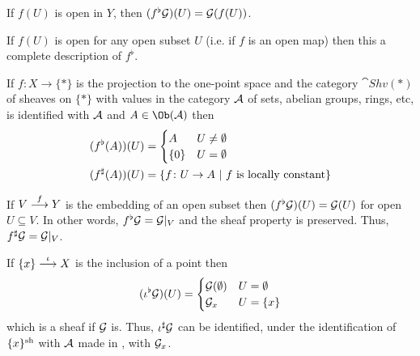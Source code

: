 \documentclass[a4paper,parskip=half,numbers=enddot, DIV=12]{scrreprt}
\begin{document}
    \begin{example}
        \begin{alphanumerate}
          \item 
            If $f(U)$ is open in $Y$, then $(f^\flat\mathcal{G})(U) = \mathcal{G}(f(U))$.
          \item 
            If $f(U)$ is open for any open subset $U$ (i.e. if $f$ is an open map) then this a complete description of $f^\flat$.
          \item 
            If $f\colon X\to \{*\}$ is the projection to the one-point space and the category $\cat{Shv}(*)$ of sheaves on $\{*\}$ with values in the category $\mathcal{A}$ of sets, abelian groups, rings, etc, is identified with $\mathcal{A}$ and $A\in\Ob(\Aa)$ then 
            \begin{align*}
                (f^\flat(A))(U) &= \begin{cases} A &U\neq\emptyset\\ \{0\} & U= \emptyset \end{cases}\\
                (f^\sharp(A))(U) &= \left\{f\colon U \to A\ \middle|\  f \text{ is locally constant}\right\}
            \end{align*}
          \item 
            If $V\morphism[f] Y$ is the embedding of an open subset then $(f^\flat \mathcal{G})(U) = \mathcal{G}(U)$ for open $U\subseteq V$. In other words, $f^\flat \mathcal{G} = \mathcal{G}|_V$ and the sheaf property is preserved. Thus, $f^\sharp \mathcal{G} = \mathcal{G}|_V$.
          \item 
            If $\{x\} \morphism[\iota] X$ is the inclusion of a point then 
            \begin{align*}
                (\iota^\flat\mathcal{G})(U) = \begin{cases} \mathcal{G}(\emptyset) & U = \emptyset \\ \mathcal{G}_x&U = \{x\}\end{cases}
            \end{align*}
            which is a sheaf if $\mathcal{G}$ is. Thus, $\iota^\sharp\mathcal{G}$ can be identified, under the identification of $\{x\}^{\mathrm{sh}}$ with $\mathcal{A}$ made in , with $\mathcal{G}_x$.
        \end{alphanumerate}
    \end{example}
\end{document}
